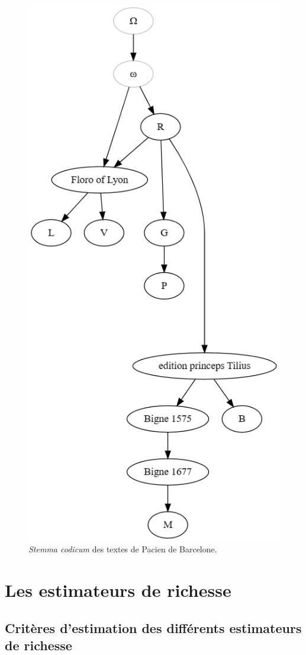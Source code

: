 \documentclass[a4paper,twoside,12pt]{book}
\begin{document}
\begin{figure}[p]  
	\centering
	\includegraphics[width=0.7\linewidth]{img/stemmapacien.png}
	\caption{\textit{Stemma codicum} des textes de Pacien de Barcelone.}
	\label{fig:stemma1}
\end{figure}

\chapter{Les estimateurs de richesse}

\section{Critères d'estimation des différents estimateurs de richesse}
\end{document}
